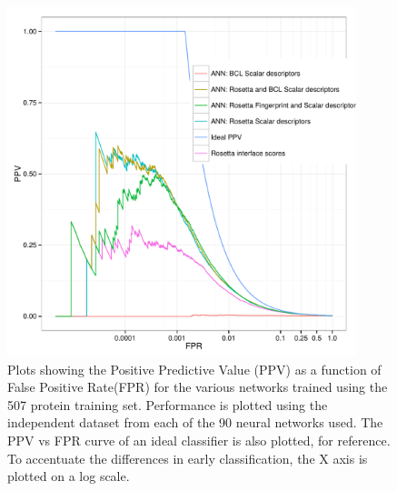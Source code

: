 \begin{figure}
\centering
\includegraphics[width=4in]{figures/hts/ppv_plot.pdf}
\caption{
Plots showing the Positive Predictive Value (PPV) as a function of False Positive Rate(FPR) for the various networks trained using the 507 protein training set.
Performance is plotted using the independent dataset from each of the 90 neural networks used.
The PPV vs FPR curve of an ideal classifier is also plotted, for reference.
To accentuate the differences in early classification, the X axis is plotted on a log scale.
}
\label{fig:ppv_plot}
\end{figure}

